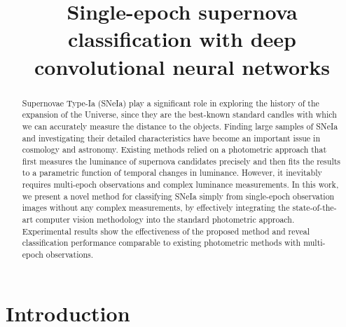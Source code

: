 \documentclass[conference,compsoc]{IEEEtran}
\begin{document}
\title{%
  Single-epoch supernova classification with deep convolutional neural networks
}



\author{
}


\maketitle

\begin{abstract}
  Supernovae Type-Ia (SNeIa) play a significant role in exploring the history of the expansion of the Universe, since they are the best-known standard candles with which we can accurately measure the distance to the objects.
  Finding large samples of SNeIa and investigating their detailed characteristics have become an important issue in cosmology and astronomy.
  Existing methods relied on a photometric approach that first measures the luminance of supernova candidates precisely and then fits the results to a parametric function of temporal changes in luminance.
  However, it inevitably requires multi-epoch observations and complex luminance measurements.
  In this work, we present a novel method for classifying SNeIa simply from single-epoch observation images without any complex measurements, by effectively integrating the state-of-the-art computer vision methodology into the standard photometric approach.
  Experimental results show the effectiveness of the proposed method and reveal classification performance comparable to existing photometric methods with multi-epoch observations.
\end{abstract}

\IEEEpeerreviewmaketitle



\section{Introduction}
\label{sec:intro}
\end{document}
